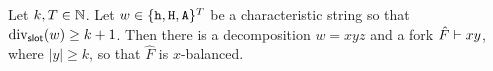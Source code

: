  


\begin{theorem}\label{thm:divergence-settlement}
  Let $k, T \in \mathbb{N}$.  
  Let $w \in \{\mathtt{h}, \mathtt{H}, \mathtt{A}\}^T$ be a characteristic string 
  so that $\mathrm{div}_{\mathsf{slot}}(w) \geq k + 1$.
  Then 
  there is a decomposition $w = xyz$ and a fork $\hat{F} \vdash xy$, 
  where $|y| \geq k$, 
  so that 
  $\hat{F}$ is $x$-balanced.
\end{theorem}


\newcommand{\Final}[1]{\tilde{#1}}

  

